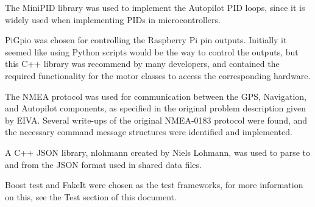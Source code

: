 The MiniPID library was used to implement the Autopilot PID loops, since it is widely used when implementing PIDs in microcontrollers.

PiGpio was chosen for controlling the Raspberry Pi pin outputs. Initially it seemed like using Python scripts would be the way to control the outputs, but this C++ library was recommend by many developers, and contained the required functionality for the motor classes to access the corresponding hardware.

The NMEA protocol was used for communication between the GPS, Navigation, and Autopilot components, as specified in the original problem description given by EIVA. Several write-ups of the original NMEA-0183 protocol were found, and the necessary command message structures were identified and implemented.

A C++ JSON library, nlohmann created by Niels Lohmann, was used to parse to and from the JSON format used in shared data files.

Boost test and FakeIt were chosen as the test frameworks, for more information on this, see the Test section of this document.


